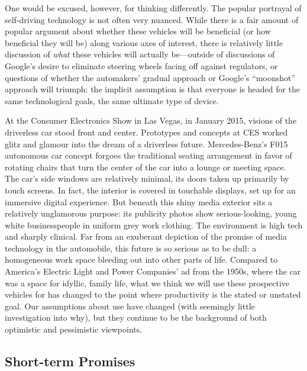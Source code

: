 One would be excused, however, for thinking differently. The popular
portrayal of self-driving technology is not often very nuanced. While
there is a fair amount of popular argument about whether these
vehicles will be beneficial (or how beneficial they will be) along
various axes of interest, there is relatively little discussion of
\emph{what} these vehicles will actually be---outside of discussions of
Google's desire to eliminate steering wheels facing off against
regulators, or questions of whether the automakers' gradual approach
or Google's ``moonshot'' approach will triumph: the implicit
assumption is that everyone is headed for the same technological
goals, the same ultimate type of device.

At the Consumer Electronics Show in Las Vegas, in January
2015, visions of the driverless car stood front and center. Prototypes
and concepts at CES worked glitz and glamour into the dream of a
driverless future. Mercedes-Benz's F015 autonomous car
concept forgoes the traditional seating arrangement in favor of
rotating chairs that turn the center of the car into a lounge or
meeting space.\cite{???} The car's side windows are relatively minimal, its
doors taken up primarily by touch screens. In fact, the interior is
covered in touchable displays, set up for an immersive digital
experience. But beneath this shiny media exterior sits a relatively
unglamorous purpose:  its publicity photos show serious-looking, young white
businesspeople in uniform grey work clothing.\cite{???} The environment is
high tech and sharply clinical. Far from an exuberant depiction of the
promise of media technology in the automobile, this future is so
serious as to be dull: a homogeneous work space bleeding out into
other parts of life. Compared to America's Electric Light and Power
Companies' ad from the 1950s, where the car was a space for idyllic,
family life, what we think we will use these prospective vehicles for
has changed to the point where productivity is the stated or unstated
goal. Our assumptions about use have changed (with seemingly little
investigation into why), but they continue to be the background of both
optimistic and pessimistic viewpoints.

\subsection{Short-term Promises}

